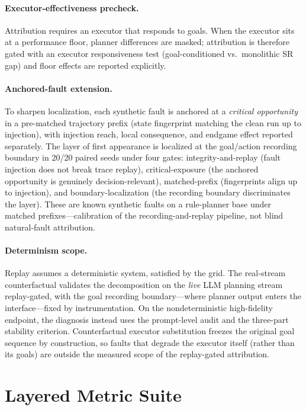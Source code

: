 \documentclass[sigconf,anonymous]{aamas}
\begin{document}
\paragraph{Executor-effectiveness precheck.}
Attribution requires an executor that responds to goals. When the executor sits at a performance floor, planner differences are masked; attribution is therefore gated with an executor responsiveness test (goal-conditioned vs.\ monolithic SR gap) and floor effects are reported explicitly.

\paragraph{Anchored-fault extension.}
To sharpen localization, each synthetic fault is anchored at a \emph{critical opportunity} in a pre-matched trajectory prefix (state fingerprint matching the clean run up to injection), with injection reach, local consequence, and endgame effect reported separately. The layer of first appearance is localized at the goal/action recording boundary in 20/20 paired seeds under four gates: integrity-and-replay (fault injection does not break trace replay), critical-exposure (the anchored opportunity is genuinely decision-relevant), matched-prefix (fingerprints align up to injection), and boundary-localization (the recording boundary discriminates the layer). These are known synthetic faults on a rule-planner base under matched prefixes---calibration of the recording-and-replay pipeline, not blind natural-fault attribution.

\paragraph{Determinism scope.}
Replay assumes a deterministic system, satisfied by the grid. The real-stream counterfactual validates the decomposition on the \emph{live} LLM planning stream replay-gated, with the goal recording boundary---where planner output enters the interface---fixed by instrumentation. On the nondeterministic high-fidelity endpoint, the diagnosis instead uses the prompt-level audit and the three-part stability criterion. Counterfactual executor substitution freezes the original goal sequence by construction, so faults that degrade the executor itself (rather than its goals) are outside the measured scope of the replay-gated attribution.

\section{Layered Metric Suite}\label{app:E}
\end{document}
